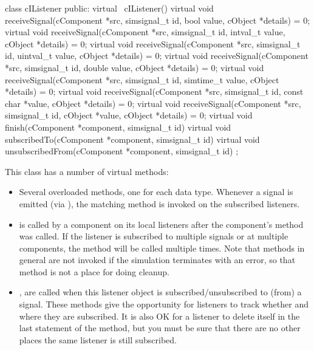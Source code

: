\begin{cpp}
class cIListener
{
  public:
    virtual ~cIListener() {}
    virtual void receiveSignal(cComponent *src, simsignal_t id,
                               bool value, cObject *details) = 0;
    virtual void receiveSignal(cComponent *src, simsignal_t id,
                               intval_t value, cObject *details) = 0;
    virtual void receiveSignal(cComponent *src, simsignal_t id,
                               uintval_t value, cObject *details) = 0;
    virtual void receiveSignal(cComponent *src, simsignal_t id,
                               double value, cObject *details) = 0;
    virtual void receiveSignal(cComponent *src, simsignal_t id,
                               simtime_t value, cObject *details) = 0;
    virtual void receiveSignal(cComponent *src, simsignal_t id,
                               const char *value, cObject *details) = 0;
    virtual void receiveSignal(cComponent *src, simsignal_t id,
                               cObject *value, cObject *details) = 0;
    virtual void finish(cComponent *component, simsignal_t id) {}
    virtual void subscribedTo(cComponent *component, simsignal_t id) {}
    virtual void unsubscribedFrom(cComponent *component, simsignal_t id) {}
};
\end{cpp}

This class has a number of virtual methods:

\begin{itemize}
  \item Several overloaded  methods, one for each
    data type. Whenever a signal is emitted (via ), the matching
     method is invoked on the subscribed listeners.
  \item {} is called by a component on its local listeners
    after the component's  method was called. If the listener
    is subscribed to multiple signals or at multiple components, the method
    will be called multiple times. Note that  methods in general
    are not invoked if the simulation terminates with an error, so that method
    is not a place for doing cleanup.
  \item {},  are called
    when this listener object is subscribed/unsubscribed to (from) a signal.
    These methods give the opportunity for listeners to track whether
    and where they are subscribed. It is also OK for a listener to delete
    itself in the last statement of the  method,
    but you must be sure that there are no other places the same listener
    is still subscribed.
\end{itemize}

